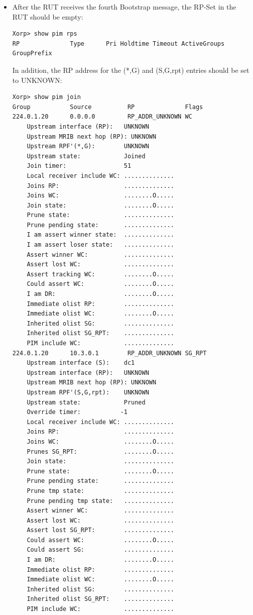 \documentclass[11pt]{report}
\begin{document}
\begin{itemize}
  \item After the RUT receives the fourth Bootstrap message, the RP-Set in the
  RUT should be empty:

\begin{verbatim}
Xorp> show pim rps 
RP              Type      Pri Holdtime Timeout ActiveGroups GroupPrefix       
\end{verbatim}

  In addition, the RP address for the (*,G) and (S,G,rpt) entries should be
  set to UNKNOWN:

\begin{verbatim}
Xorp> show pim join 
Group           Source          RP              Flags
224.0.1.20      0.0.0.0         RP_ADDR_UNKNOWN WC   
    Upstream interface (RP):   UNKNOWN
    Upstream MRIB next hop (RP): UNKNOWN
    Upstream RPF'(*,G):        UNKNOWN
    Upstream state:            Joined 
    Join timer:                51
    Local receiver include WC: ..............
    Joins RP:                  ..............
    Joins WC:                  ........O.....
    Join state:                ........O.....
    Prune state:               ..............
    Prune pending state:       ..............
    I am assert winner state:  ..............
    I am assert loser state:   ..............
    Assert winner WC:          ..............
    Assert lost WC:            ..............
    Assert tracking WC:        ........O.....
    Could assert WC:           ........O.....
    I am DR:                   ........O.....
    Immediate olist RP:        ..............
    Immediate olist WC:        ........O.....
    Inherited olist SG:        ..............
    Inherited olist SG_RPT:    ..............
    PIM include WC:            ..............
224.0.1.20      10.3.0.1        RP_ADDR_UNKNOWN SG_RPT 
    Upstream interface (S):    dc1
    Upstream interface (RP):   UNKNOWN
    Upstream MRIB next hop (RP): UNKNOWN
    Upstream RPF'(S,G,rpt):    UNKNOWN
    Upstream state:            Pruned 
    Override timer:           -1
    Local receiver include WC: ..............
    Joins RP:                  ..............
    Joins WC:                  ........O.....
    Prunes SG_RPT:             ........O.....
    Join state:                ..............
    Prune state:               ........O.....
    Prune pending state:       ..............
    Prune tmp state:           ..............
    Prune pending tmp state:   ..............
    Assert winner WC:          ..............
    Assert lost WC:            ..............
    Assert lost SG_RPT:        ..............
    Could assert WC:           ........O.....
    Could assert SG:           ..............
    I am DR:                   ........O.....
    Immediate olist RP:        ..............
    Immediate olist WC:        ........O.....
    Inherited olist SG:        ..............
    Inherited olist SG_RPT:    ..............
    PIM include WC:            ..............
\end{verbatim}

\end{itemize}
\end{document}
